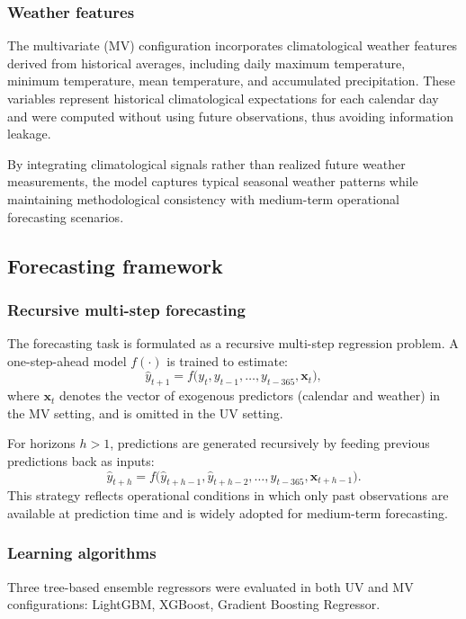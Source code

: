 \subsubsection{Weather features}

The multivariate (MV) configuration incorporates climatological weather features derived from historical averages, including daily maximum temperature, minimum temperature, mean temperature, and accumulated precipitation. These variables represent historical climatological expectations for each calendar day and were computed without using future observations, thus avoiding information leakage.

By integrating climatological signals rather than realized future weather measurements, the model captures typical seasonal weather patterns while maintaining methodological consistency with medium-term operational forecasting scenarios.

\subsection{Forecasting framework}
\label{subsec:forecasting_framework}

\subsubsection{Recursive multi-step forecasting}
The forecasting task is formulated as a recursive multi-step regression problem. A one-step-ahead model $f(\cdot)$ is trained to estimate:
\begin{equation}
\hat{y}_{t+1} = f\big( y_t, y_{t-1}, \dots, y_{t-365}, \mathbf{x}_t \big),
\end{equation}
where $\mathbf{x}_t$ denotes the vector of exogenous predictors (calendar and weather) in the MV setting, and is omitted in the UV setting.

For horizons $h>1$, predictions are generated recursively by feeding previous predictions back as inputs:
\begin{equation}
\hat{y}_{t+h} = f\big( \hat{y}_{t+h-1}, \hat{y}_{t+h-2}, \dots, y_{t-365}, \mathbf{x}_{t+h-1} \big).
\end{equation}
This strategy reflects operational conditions in which only past observations are available at prediction time and is widely adopted for medium-term forecasting.

\subsubsection{Learning algorithms}
Three tree-based ensemble regressors were evaluated in both UV and MV configurations: LightGBM, XGBoost, Gradient Boosting Regressor.

